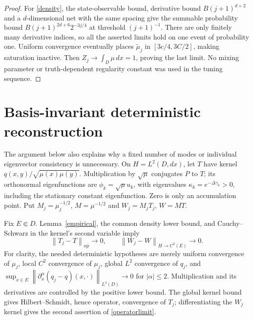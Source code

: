 \documentclass[11pt]{article}
\theoremstyle{remark}\newtheorem{remark}[theorem]{Remark}
\newcommand{\dd}{\,dx}
\newcommand{\op}{\mathrm{op}}
\newcommand{\norm}[1]{\left\lVert#1\right\rVert}
\begin{document}
\begin{proof}
For \eqref{density}, the state-observable bound, derivative bound
$B(j+1)^{d+2}$ and a $d$-dimensional net with the same spacing give the
summable probability bound
$B(j+1)^{2d+6}2^{-3j/4}$ at threshold $(j+1)^{-1}$.
There are only finitely many derivative indices, so all the asserted limits
hold on one event of probability one. Uniform convergence eventually places
$\widetilde\mu_j$ in $[3c/4,3C/2]$, making saturation inactive. Then
$Z_j\to\int_D\mu\dd=1$, proving the last limit. No mixing parameter or
truth-dependent regularity constant was used in the tuning sequence.
\end{proof}

\section{Basis-invariant deterministic reconstruction}
The argument below also explains why a fixed number of modes or individual
eigenvector consistency is unnecessary. On $H=L^2(D,dx)$, let $T$ have
kernel $q(x,y)/\sqrt{\mu(x)\mu(y)}$. Multiplication by $\sqrt\mu$ conjugates
$P$ to $T$; its orthonormal eigenfunctions are $\phi_k=\sqrt\mu u_k$,
with eigenvalues $\kappa_k=e^{-\Delta\gamma_k}>0$, including the stationary
constant eigenfunction. Zero is only an accumulation point. Put
$M_j=\mu_j^{-1/2}$, $M=\mu^{-1/2}$ and $W_j=M_jT_j$, $W=MT$.

Fix $E\Subset D$. Lemma~\ref{empirical}, the common density lower bound,
and Cauchy--Schwarz in the kernel's second variable imply
\begin{equation}\label{operatorlimit}
 \norm{T_j-T}_\op\longrightarrow0,\qquad
 \norm{W_j-W}_{H\to C^2(E)}\longrightarrow0.
\end{equation}
For clarity, the needed deterministic hypotheses are merely uniform
convergence of $\mu_j$, local $C^2$ convergence of $\mu_j$, global
$L^2$ convergence of $q_j$, and
$\sup_{x\in E}\norm{\partial_x^\alpha(q_j-q)(x,\cdot)}_{L^2(D)}\to0$
for $|\alpha|\leq2$. Multiplication and its derivatives are controlled by
the positive lower bound. The global kernel bound gives Hilbert--Schmidt,
hence operator, convergence of $T_j$; differentiating the $W_j$ kernel gives
the second assertion of \eqref{operatorlimit}.
\end{document}
